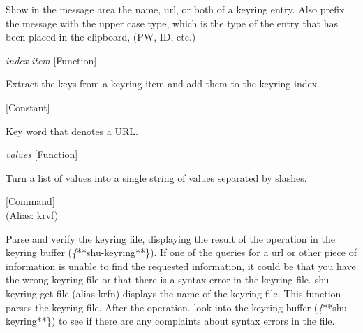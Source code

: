 \begin{doc-string}
Show in the message area the name, url, or both of a keyring entry.  Also prefix
the message with the upper case type, which is the type of the entry that has been
placed in the clipboard, (PW, ID, etc.)
\end{doc-string}

\vspace{1em}
\noindent
{}
\usebox{\funcname}\emph{index} \emph{item}
 \hfill [Function]

\begin{doc-string}
Extract the keys from a keyring item and add them to the keyring index.
\end{doc-string}

\vspace{1em}
\noindent
{}
\usebox{\funcname}
 \hfill [Constant]

\begin{doc-string}
Key word that denotes a URL.
\end{doc-string}

\vspace{1em}
\noindent
{}
\usebox{\funcname}\emph{values}
 \hfill [Function]

\begin{doc-string}
Turn a list of values into a single string of values separated by slashes.
\end{doc-string}

\vspace{1em}
\noindent
{}
\usebox{\funcname}
 \hfill [Command]\\%
 (Alias: krvf)

\begin{doc-string}
Parse and verify the keyring file, displaying the result of the operation in the
keyring buffer (\emph\{**shu-keyring**\}).  If one of the queries for a url or other
piece of information is unable to find the requested information, it could be
that you have the wrong keyring file or that there is a syntax error in the
keyring file.  shu-keyring-get-file (alias krfn) displays the name of the
keyring file.  This function parses the keyring file.  After the operation. look
into the keyring buffer (\emph\{**shu-keyring**\}) to see if there are any complaints
about syntax errors in the file.
\end{doc-string}

